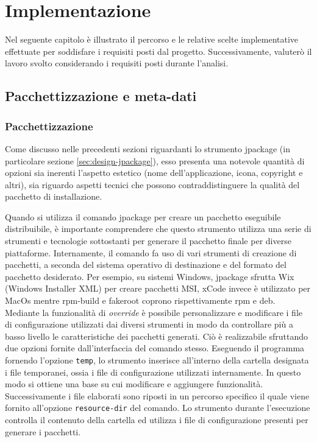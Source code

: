 
\chapter{Implementazione}

Nel seguente capitolo è illustrato il percorso e le relative scelte implementative effettuate per soddisfare i requisiti posti dal progetto. Successivamente, valuterò il lavoro svolto considerando i requisiti posti durante l'analisi.

\section{Pacchettizzazione e meta-dati}

\subsection{Pacchettizzazione}

Come discusso nelle precedenti sezioni riguardanti lo strumento jpackage (in particolare sezione \ref{sec:design-jpackage}), esso presenta una notevole quantità di opzioni sia inerenti l'aspetto estetico (nome dell'applicazione, icona, copyright e altri), sia riguardo aspetti tecnici che possono contraddistinguere la qualità del pacchetto di installazione. 

Quando si utilizza il comando jpackage per creare un pacchetto eseguibile distribuibile, è importante comprendere che questo strumento utilizza una serie di strumenti e tecnologie sottostanti per generare il pacchetto finale per diverse piattaforme. Internamente, il comando fa uso di vari strumenti di creazione di pacchetti, a seconda del sistema operativo di destinazione e del formato del pacchetto desiderato. Per esempio, su sistemi Windows, jpackage sfrutta Wix (Windows Installer XML) per creare pacchetti MSI, xCode invece è utilizzato per MacOs mentre rpm-build e fakeroot coprono rispettivamente rpm e deb. Mediante la funzionalità di \textit{override} è possibile personalizzare e modificare i file di configurazione utilizzati dai diversi strumenti in modo da controllare più a basso livello le caratteristiche dei pacchetti generati. Ciò è realizzabile sfruttando due opzioni fornite dall'interfaccia del comando stesso. Eseguendo il programma fornendo l'opzione \texttt{temp}, lo strumento inserisce all'interno della cartella designata i file temporanei, ossia i file di configurazione utilizzati internamente. In questo modo si ottiene una base su cui modificare e aggiungere funzionalità. Successivamente i file elaborati sono riposti in un percorso specifico il quale viene fornito all'opzione \texttt{resource-dir} del comando. Lo strumento durante l'esecuzione controlla il contenuto della cartella ed utilizza i file di configurazione presenti per generare i pacchetti. 

